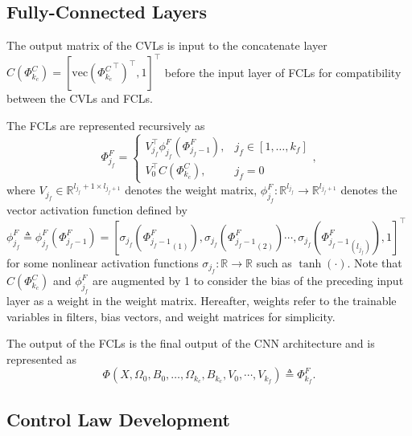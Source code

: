 \documentclass[letterpaper, 10 pt, conference]{ieeeconf}  %
\begin{document}
\subsection{Fully-Connected Layers}

The output matrix of the CVLs is input to the concatenate layer $C(\Phi^C_{k_c}) = [\text{vec}({\Phi^C_{k_c}}^\top  )^\top  ,1]^\top$ before the input layer of FCLs for compatibility between the CVLs and FCLs.

The FCLs are represented recursively as 
\begin{equation}
    \Phi^F_{j_f} =
        \begin{cases}
            V^\top  _{j_f}\phi^F_{j_f}(\Phi^F_{j_f-1}),  & j_f\in[1,\dots,k_f]   \\
            V_0^\top   C(\Phi^C_{k_c}),                  & j_f=0
        \end{cases},
\end{equation}
where $V_{j_f}\in\mathbb{R}^{l_{j_f}+1\times l_{j_f+1}}$ denotes the weight matrix, $\phi^F_{j_f}:\mathbb{R}^{l_{j_f}}\to\mathbb{R}^{l_{j_f+1}}$ denotes the vector activation function defined by
$\phi^F_{j_f} \triangleq \phi^F_{j_f}(\Phi^F_{j_f-1})=[\sigma_{j_f}({\Phi^F_{j_f-1}}_{(1)}),\sigma_{j_f}({\Phi^F_{j_f-1}}_{(2)})\cdots,\sigma_{j_f}({\Phi^F_{j_f-1}}_{(l_{j_f})}),1]^\top$ for some nonlinear activation functions $\sigma_{j_f}:\mathbb{R}\to\mathbb{R}$ such as $\tanh(\cdot)$. Note that $C(\Phi^C_{k_c})$ and $\phi^F_{j_f}$ are augmented by 1 to consider the bias of the preceding input layer as a weight in the weight matrix. Hereafter, weights refer to the trainable variables in filters, bias vectors, and weight matrices for simplicity.

The output of the FCLs is the final output of the CNN architecture and is represented as
\begin{equation}
    \Phi(X,\Omega_0,B_0,\dots,\Omega_{k_c},B_{k_c},V_0,\cdots,V_{k_f}) \triangleq \Phi^F_{k_f}.
\end{equation}

\subsection{Control Law Development} \label{Coltrol Law Development}
\end{document}
